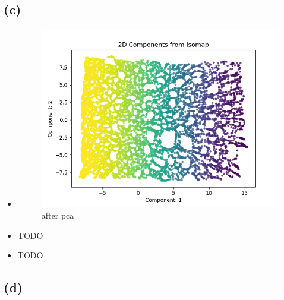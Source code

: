 \documentclass[a4paper]{article}
\begin{document}
\subsection*{(c)}
\begin{itemize}
	\item \begin{figure}[!ht]
		\centering
		\includegraphics[width=0.7\linewidth]{swiss_roll_result}
		\caption{after pca}
	\end{figure}
	\item TODO
	\item TODO
\end{itemize}


\subsection*{(d)}
\end{document}
